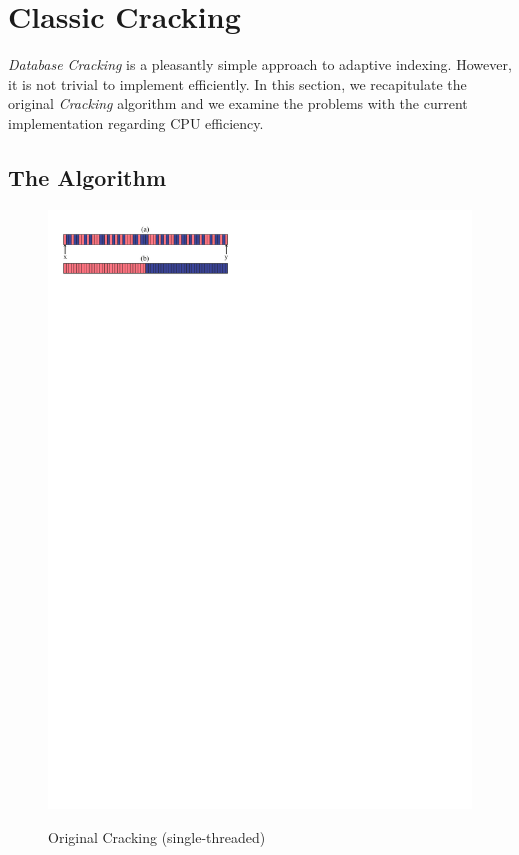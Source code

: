 \section{Classic Cracking}
\label{sec:classic-cracking}
\emph{Database Cracking} is a pleasantly simple approach to adaptive
indexing.  However, it is not trivial to implement efficiently. In this
section, we recapitulate the original \emph{Cracking} algorithm and we
examine the problems with the current implementation regarding CPU
efficiency.

\subsection*{The Algorithm}
\label{sec:algorithm}

\begin{figure}[!t]
\begin{center}
\includegraphics[trim=0.6cm 26.7cm 0cm 1cm]{Figures/damon/naive}
\vspace{-0.2 in}
\caption{Original Cracking (single-threaded)}
\vspace{-0.37 in}
\label{fig:naive}
\end{center}
\end{figure}

